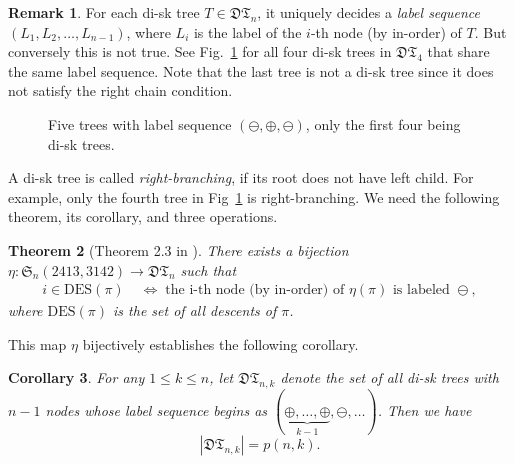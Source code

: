 \documentclass[11pt,reqno]{amsart}
\numberwithin{equation}{section}
\theoremstyle{plain}
\newtheorem{theorem}{Theorem}[section]
\newtheorem{corollary}[theorem]{Corollary}
\theoremstyle{definition}
\newtheorem{remark}[theorem]{Remark}
\def\DT{\mathfrak{DT}}
\def\DES{\mathrm{DES}}
\begin{document}
\begin{remark}
For each di-sk tree $T\in\mathfrak{DT}_n$, it uniquely decides a \emph{label sequence} $(L_1,L_2,\ldots,L_{n-1})$, where $L_i$ is the label of the $i$-th node (by in-order) of $T$. But conversely this is not true. See Fig.~\ref{label seq} for all four di-sk trees in $\mathfrak{DT}_{4}$ that share the same label sequence. Note that the last tree is not a di-sk tree since it does not satisfy the right chain condition.
\end{remark}

\begin{figure}
\caption{Five trees with label sequence $(\ominus,\oplus,\ominus)$, only the first four being di-sk trees.}\label{label seq}
\end{figure}

A di-sk tree is called \emph{right-branching}, if its root does not have left child. For example, only the fourth tree in Fig~\ref{label seq} is right-branching. We need the following theorem, its corollary, and three operations.

\begin{theorem}[Theorem 2.3 in \cite{FLZ}]\label{FLZ-bij}
There exists a bijection $\eta: \mathfrak{S}_n(2413,3142)\rightarrow \mathfrak{DT}_n$ such that
\begin{align*}
i\in\DES(\pi)\; &\Leftrightarrow \; \text{the i-th node (by in-order) of $\eta(\pi)$ is labeled $\ominus$},
\end{align*}
where $\DES(\pi)$ is the set of all descents of $\pi$.
\end{theorem}
This map $\eta$ bijectively establishes the following corollary.
\begin{corollary}\label{dt=sp/iar}
For any $1\le k\le n$, let $\DT_{n,k}$ denote the set of all di-sk trees with $n-1$ nodes whose label sequence begins as $(\underbrace{\oplus,\ldots,\oplus}_{k-1},\ominus,\ldots)$. Then we have $$|\DT_{n,k}|=p(n,k).$$
\end{corollary}
\end{document}
